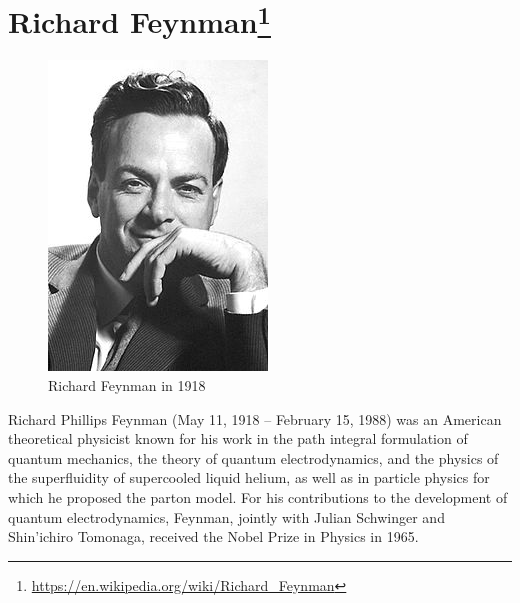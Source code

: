 \section*{Richard Feynman\protect\footnote{\url{https://en.wikipedia.org/wiki/Richard_Feynman}}}

\begin{figure}[ht]
  \centering
  \includegraphics[width=0.8\linewidth]{content/figures/richard_feynman_picuture.jpg}
  \caption{Richard Feynman in 1918\protect\footnotemark}
\end{figure}

Richard Phillips Feynman (May 11, 1918 – February 15, 1988) was an American theoretical physicist known for his work in the path integral formulation of quantum mechanics, the theory of quantum electrodynamics, and the physics of the superfluidity of supercooled liquid helium, as well as in particle physics for which he proposed the parton model. For his contributions to the development of quantum electrodynamics, Feynman, jointly with Julian Schwinger and Shin'ichiro Tomonaga, received the Nobel Prize in Physics in 1965.

